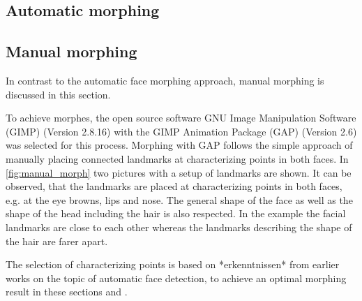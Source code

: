 \subsection{Automatic morphing}
\label{automatic_morph}


\subsection{Manual morphing}
\label{manual_morph}
In contrast to the automatic face morphing approach, manual morphing is discussed in this section. 

To achieve morphes, the open source software GNU Image Manipulation Software (GIMP) (Version 2.8.16) with the GIMP Animation Package (GAP) (Version 2.6) was selected for this process. Morphing with GAP follows the simple approach of manually placing connected landmarks at characterizing points in both faces. In \ref{fig:manual_morph} two pictures with a setup of landmarks are shown. It can be observed, that the landmarks are placed at characterizing points in both faces, e.g. at the eye browns, lips and nose. The general shape of the face as well as the shape of the head including the hair is also respected. In the example the facial landmarks are close to each other whereas the landmarks describing the shape of the hair are farer apart. 

The selection of characterizing points is based on *erkenntnissen* from earlier works on the topic of automatic face detection, to achieve an optimal morphing result in these sections   and . 

